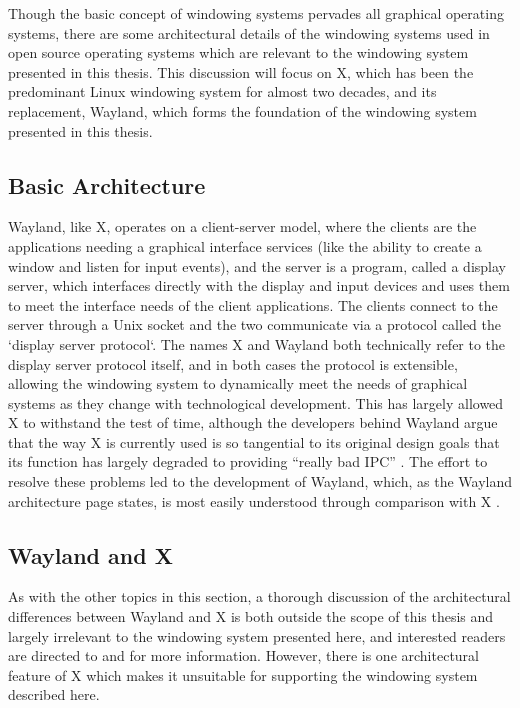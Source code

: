 Though the basic concept of windowing systems pervades all graphical operating systems, there are some architectural details of the windowing systems used in open source operating systems which are relevant to the windowing system presented in this thesis. This discussion will focus on X, which has been the predominant Linux windowing system for almost two decades, and its replacement, Wayland, which forms the foundation of the windowing system presented in this thesis.

\subsection{Basic Architecture}

Wayland, like X, operates on a client-server model, where the clients are the applications needing a graphical interface services (like the ability to create a window and listen for input events), and the server is a program, called a display server, which interfaces directly with the display and input devices and uses them to meet the interface needs of the client applications. The clients   connect to the server through a Unix socket and the two communicate via a protocol called the `display server protocol`. The names X and Wayland both technically refer to the display server protocol itself, and in both cases the protocol is extensible, allowing the windowing system to dynamically meet the needs of graphical systems as they change with technological development. This has largely allowed X to withstand the test of time, although the developers behind Wayland argue that the way X is currently used is so tangential to its original design goals that its function has largely degraded to providing “really bad IPC” \cite{real-story-wayland}. The effort to resolve these problems led to the development of Wayland, which, as the Wayland architecture page states, is most easily understood through comparison with X \cite{wayland}.

\subsection{Wayland and X}

As with the other topics in this section, a thorough discussion of the architectural differences between Wayland and X is both outside the scope of this thesis and largely irrelevant to the windowing system presented here, and interested readers are directed to \cite{wayland} and \cite{real-story-wayland} for more information. However, there is one architectural feature of X which makes it unsuitable for supporting the windowing system described here.


